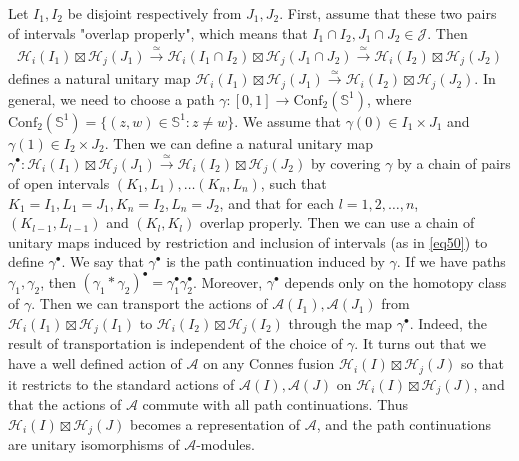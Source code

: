 \documentclass[12pt,a4paper]{article}
\theoremstyle{definition}
\theoremstyle{plain}
\newcommand{\mc}{\mathcal}
\newcommand{\Conf}{\mathrm{Conf}}
\newcommand{\mbb}{\mathbb}
\numberwithin{equation}{section}
\begin{document}
Let $I_1,I_2$ be disjoint respectively from $J_1,J_2$. First, assume that these two pairs of intervals "overlap properly", which means that $I_1\cap I_2,J_1\cap J_2\in\mc J$. Then
\begin{align}
\mc H_i(I_1)\boxtimes \mc H_j(J_1)\xrightarrow{\simeq}\mc H_i(I_1\cap I_2)\boxtimes \mc H_j(J_1\cap J_2)\xrightarrow{\simeq}\mc H_i(I_2)\boxtimes \mc H_j(J_2)\label{eq50}
\end{align}
defines a natural unitary map $\mc H_i(I_1)\boxtimes \mc H_j(J_1)\xrightarrow{\simeq}\mc H_i(I_2)\boxtimes \mc H_j(J_2)$. In general, we need to choose a path $\gamma:[0,1]\rightarrow \Conf_2(\mbb S^1)$, where $\Conf_2(\mbb S^1)=\{(z,w)\in\mbb S^1:z\neq w \}$. We assume that $\gamma(0)\in I_1\times J_1$ and $\gamma(1)\in I_2\times J_2$. Then we can define a natural unitary map $\gamma^\bullet:\mc H_i(I_1)\boxtimes \mc H_j(J_1)\xrightarrow{\simeq}\mc H_i(I_2)\boxtimes \mc H_j(J_2)$ by covering $\gamma$ by a chain of pairs of open intervals $(K_1,L_1),\dots (K_n,L_n)$, such that $K_1=I_1,L_1=J_1,K_n=I_2,L_n=J_2$, and that for each $l=1,2,\dots,n$, $(K_{l-1},L_{l-1})$ and $(K_l,K_l)$ overlap properly. Then we can use a chain of unitary maps induced by restriction and inclusion of intervals (as in \eqref{eq50}) to define $\gamma^\bullet$. We say that $\gamma^\bullet$ is the path continuation induced by $\gamma$. If we have paths $\gamma_1,\gamma_2$, then $(\gamma_1\ast\gamma_2)^\bullet=\gamma_1^\bullet\gamma_2^\bullet$. Moreover, $\gamma^\bullet$ depends only on the homotopy class of $\gamma$.  Then we can transport the actions of $\mc A(I_1),\mc A(J_1)$ from $\mc H_i(I_1)\boxtimes \mc H_j(I_1)$ to $\mc H_i(I_2)\boxtimes \mc H_j(I_2)$ through the map $\gamma^\bullet$. Indeed, the result of transportation is independent of the choice of $\gamma$. It turns out that we have a well defined action of $\mc A$ on any Connes fusion $\mc H_i(I)\boxtimes\mc H_j(J)$ so that it restricts to the standard actions of $\mc A(I),\mc A(J)$ on $\mc H_i(I)\boxtimes\mc H_j(J)$, and that the actions of $\mc A$ commute with all path continuations. Thus $\mc H_i(I)\boxtimes\mc H_j(J)$ becomes a representation of $\mc A$, and the path continuations are unitary isomorphisms of $\mc A$-modules.
\end{document}
